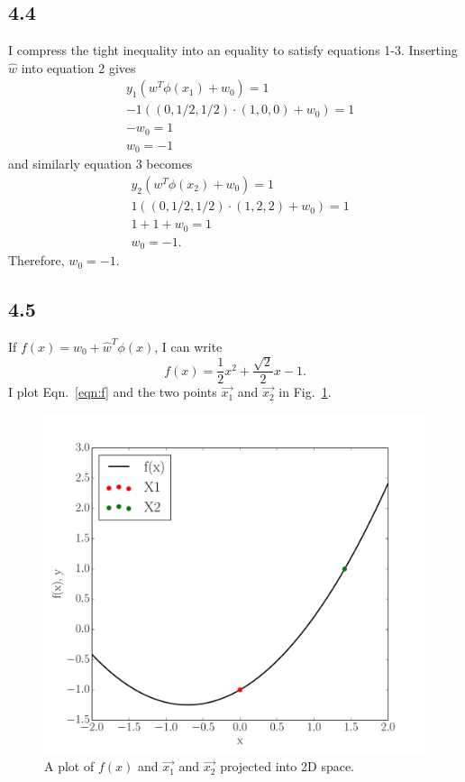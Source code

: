 \documentclass[12pt]{amsart}
\begin{document}
\subsection*{4.4}
I compress the tight inequality into an equality to satisfy equations 1-3.  Inserting $\hat{w}$ into equation 2 gives
\begin{equation}
\begin{split}
& y_1(w^T\phi(x_1) + w_0) = 1 \\
& -1((0,1/2,1/2) \cdot (1,0,0) + w_0) = 1 \\
& -w_0 = 1 \\
& w_0 = -1
\end{split}
\end{equation}
and similarly equation 3 becomes 
\begin{equation}
\begin{split}
& y_2(w^T\phi(x_2) + w_0) = 1 \\
& 1((0,1/2,1/2) \cdot (1,2,2) + w_0) = 1 \\
& 1 + 1 + w_0 = 1 \\
& w_0 = -1.
\end{split}
\end{equation}
Therefore, $w_0 = -1$.

\subsection*{4.5}
If $f(x) = w_0 + \hat{w}^T \phi(x)$, I can write
\begin{equation} \label{eqn:f}
f(x) = \frac{1}{2}x^2 + \frac{\sqrt{2}}{2}x - 1.
\end{equation}
I plot Eqn.~\ref{eqn:f} and the two points $\vec{x_1}$ and $\vec{x_2}$ in Fig.~\ref{fig:svm}.

\begin{figure}[H]
	\includegraphics[width=\columnwidth]{svm_by_hand.pdf}
    \caption{A plot of $f(x)$ and $\vec{x_1}$ and $\vec{x_2}$ projected into 2D space.}
    \label{fig:svm}
\end{figure}
\end{document}
